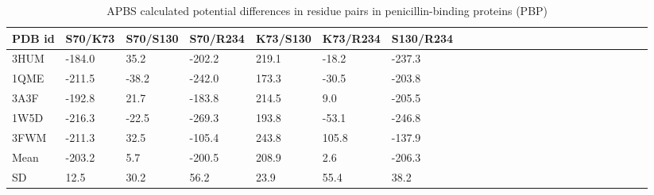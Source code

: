 \begin{center} 
\begin{table*} 
\begin{tabular}{ l l l l l l l l l l l l l l l l  l l  l l l l l l } 
\hline 
PDB id &    S70/K73  &    S70/S130 &   S70/R234 &   K73/S130 &    K73/R234  &   S130/R234 \\
\hline 
3HUM &   -184.0 &     35.2 &   -202.2 &    219.1 &    -18.2 &   -237.3 \\ 
 1QME &   -211.5 &    -38.2 &   -242.0 &    173.3 &    -30.5 &   -203.8 \\ 
 3A3F &   -192.8 &     21.7 &   -183.8 &    214.5 &      9.0 &   -205.5 \\ 
 1W5D &   -216.3 &    -22.5 &   -269.3 &    193.8 &    -53.1 &   -246.8 \\ 
 3FWM &   -211.3 &     32.5 &   -105.4 &    243.8 &    105.8 &   -137.9 \\ 
\hline 
Mean &        -203.2 &      5.7 &   -200.5 &    208.9 &      2.6 &   -206.3 \\ 
\hline 
SD &           12.5 &     30.2 &     56.2 &     23.9 &     55.4 &     38.2 \\ 
\hline 
\end{tabular} 
\caption {APBS calculated potential differences in residue pairs in penicillin-binding proteins (PBP) }  \label{table:PBP}  
\end{table*} 
\end{center} 
